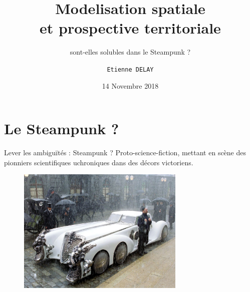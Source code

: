 \documentclass[newPxFont]{beamer}
\title{Modelisation spatiale \\et prospective territoriale}
\subtitle{sont-elles solubles dans le Steampunk ?}
\date{14 Novembre 2018}
\author{\texttt{Etienne DELAY}}
\institute{UR GREEN}
\begin{document}
%
%

\maketitle


%
%

\section{Le Steampunk ?}


\begin{frame}[c]{Lever les ambiguïtés : Steampunk ? }
  \vspace{-1cm}
  Proto-science-fiction, mettant en scène des pionniers scientifiques uchroniques dans des décors victoriens.
  \begin{figure}
    \includegraphics[height=6cm]{img/a_steampunk_car.jpg}
  \end{figure}
\end{frame}
\end{document}

